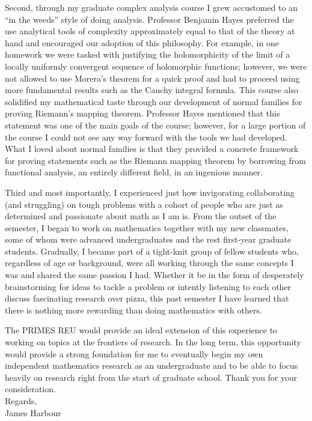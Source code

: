 \documentclass[11pt]{article}
\begin{document}
Second, through my graduate complex analysis course I grew accustomed to an ``in the weeds'' style of doing analysis. Professor Benjamin Hayes preferred the use analytical tools of complexity approximately equal to that of the theory at hand and encouraged our adoption of this philosophy. For example, in one homework we were tasked with justifying the holomorphicity of the limit of a locally uniformly convergent sequence of holomorphic functions; however, we were not allowed to use Morera's theorem for a quick proof and had to proceed using more fundamental results such as the Cauchy integral formula. This course also solidified my mathematical taste through our development of normal families for proving Riemann's mapping theorem. Professor Hayes mentioned that this statement was one of the main goals of the course; however, for a large portion of the course I could not see any way forward with the tools we had developed. What I loved about normal families is that they provided a concrete framework for proving statements such as the Riemann mapping theorem by borrowing from functional analysis, an entirely different field, in an ingenious manner.


Third and most importantly, I experienced just how invigorating collaborating (and struggling) on tough problems with a cohort of people who are just as determined and passionate about math as I am is. From the outset of the semester, I began to work on mathematics together with my new classmates, some of whom were advanced undergraduates and the rest first-year graduate students. Gradually, I became part of a tight-knit group of fellow students who, regardless of age or background, were all working through the same concepts I was and shared the same passion I had. Whether it be in the form of desperately brainstorming for ideas to tackle a problem or intently listening to each other discuss fascinating research over pizza, this past semester I have learned that there is nothing more rewarding than doing mathematics with others.

The PRIMES REU would provide an ideal extension of this experience to working on topics at the frontiers of research. In the long term, this opportunity would provide a strong foundation for me to eventually begin my own independent mathematics research as an undergraduate and to be able to focus heavily on research right from the start of graduate school. Thank you for your consideration. \\
\vspace{0.5cm}
\noindent Regards, \\

\noindent James Harbour
\end{document}
